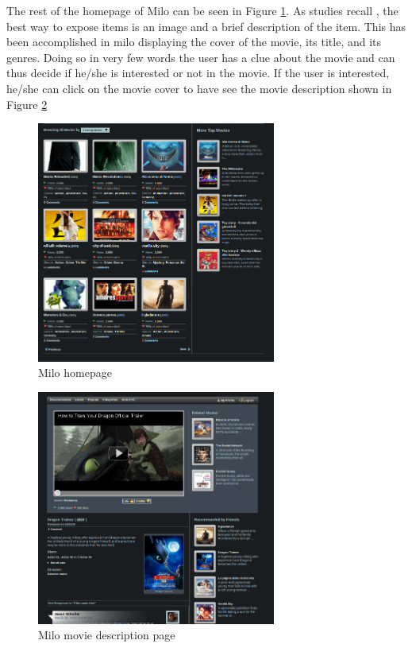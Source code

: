 The rest of the homepage of Milo can be seen in Figure \ref{fig:milo_homepage}. As studies recall \cite{applicaion-domain-and-functional-classification}, the best way to expose items is an image and a brief description of the item. This has been accomplished in milo displaying the cover of the movie, its title, and its genres. Doing so in very few words the user has a clue about the movie and can thus decide if he/she is interested or not in the movie. If the user is interested, he/she can click on the movie cover to have see the movie description shown in Figure \ref{fig:milo_movie} 

\begin{figure}
  \centering
  \includegraphics[width=0.7\textwidth]{figures/milo_homepage.png}
  \caption{Milo homepage}
  \label{fig:milo_homepage}
\end{figure}

\begin{figure}
  \centering
  \includegraphics[width=0.7\textwidth]{figures/milo_movie.png}
  \caption{Milo movie description page}
  \label{fig:milo_movie}
\end{figure}

